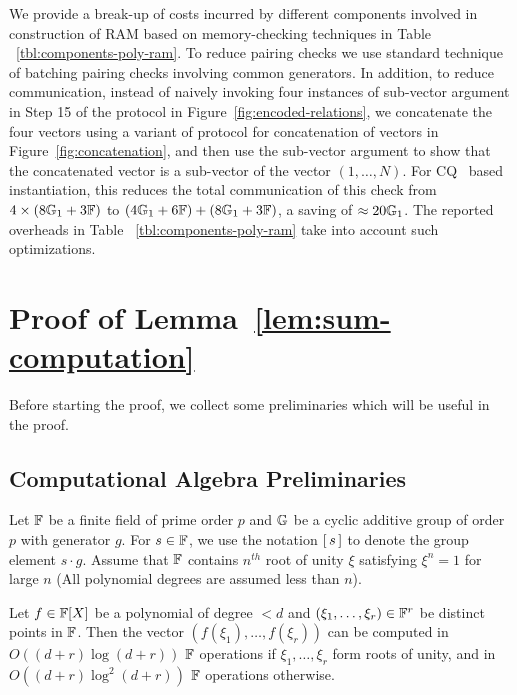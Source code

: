 We provide a break-up of costs incurred by different components involved in construction
of RAM based on memory-checking techniques in Table ~\ref{tbl:components-poly-ram}. To reduce pairing
checks we use standard technique of batching pairing checks involving common generators. In addition, to reduce
communication, instead of naively invoking four instances of sub-vector argument in Step 15 of the protocol
in Figure~\ref{fig:encoded-relations}, we concatenate the four vectors using a variant of protocol for
concatenation of vectors in Figure~\ref{fig:concatenation}, and then use the sub-vector argument to show that
the concatenated vector is a sub-vector of the vector $(1,\ldots,N)$. For CQ~\cite{EPRINT:EagFioGab22} based instantiation,
this reduces the total communication of this
check from $4\times (8\mathbb{G}_1 + 3\mathbb{F})$ to $(4\mathbb{G}_1+6\mathbb{F}) + (8\mathbb{G}_1 + 3\mathbb{F})$, a saving of $\approx 20\mathbb{G}_1$. The reported
overheads in Table ~\ref{tbl:components-poly-ram} take into account such optimizations.

\section{Proof of Lemma~\ref{lem:sum-computation}}
Before starting the proof, we collect some preliminaries which will be useful in the proof.

\subsection{Computational Algebra Preliminaries}\label{subsec:comp-algebra-app}
Let $\mathbb{F}$ be a finite field of prime order $p$ and $\mathbb{G}$ be a cyclic additive group of order $p$ with generator $g$. For $s \in \mathbb{F}$, we use
the notation $[\,{s}\,]$ to denote the group element $s\cdot g$. Assume that $\mathbb{F}$ contains $n^{th}$ root of unity $\xi$
satisfying $\xi^n=1$ for large $n$ (All polynomial degrees are assumed less than $n$).

\begin{fact}\label{fc:fft}
Let $f\in \mathbb{F}[X]$ be a polynomial of degree $<d$ and $(\xi_1,\ldots,\xi_r)\in \mathbb{F}^r$ be distinct points in $\mathbb{F}$.
Then the vector $(f(\xi_1),\ldots,f(\xi_r))$ can be computed in $O((d+r)\log (d+r))$ $\mathbb{F}$ operations if $\xi_1,\ldots,\xi_r$ form roots
of unity, and in $O((d+r)\log^2(d+r))$ $\mathbb{F}$ operations otherwise.
\end{fact}


